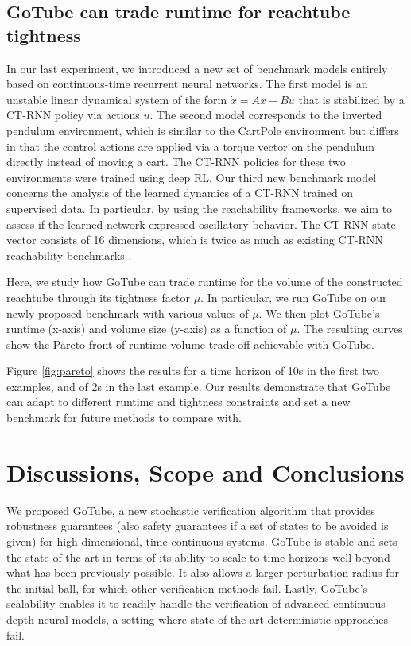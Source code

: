 \documentclass[letterpaper]{article} %
\begin{document}
\subsection{GoTube can trade runtime for reachtube tightness}
In our last experiment, we introduced a new set of benchmark models entirely based on continuous-time recurrent neural networks. 
The first model is an unstable linear dynamical system of the form $\dot{x} = Ax + Bu$ that is stabilized by a CT-RNN policy via actions $u$. The second model corresponds to the inverted pendulum environment, which is similar to the CartPole environment but differs in that the control actions are applied via a torque vector on the pendulum directly instead of moving a cart. The CT-RNN policies for these two environments were trained using deep RL.
Our third new benchmark model concerns the analysis of the learned dynamics of a CT-RNN trained on supervised data. In particular, by using the reachability frameworks, we aim to assess if the learned network expressed oscillatory behavior. The CT-RNN state vector consists of 16 dimensions, which is twice as much as existing CT-RNN reachability benchmarks \cite{gruenbacher2020lagrangian}. 

Here, we study how GoTube can trade runtime for the volume of the constructed reachtube through its tightness factor $\mu$.
In particular, we run GoTube on our newly proposed benchmark with various values of $\mu$. We then plot GoTube's runtime (x-axis) and volume size (y-axis) as a function of $\mu$. The resulting curves show the Pareto-front of runtime-volume trade-off achievable with GoTube.

Figure \ref{fig:pareto} shows the results for a time horizon of 10s in the first two examples, and of 2s in the last example.
Our results demonstrate that GoTube can adapt to different runtime and tightness constraints and set a new benchmark for future methods to compare with.

\section{Discussions, Scope and Conclusions}

We proposed GoTube, a new stochastic verification algorithm that provides robustness guarantees (also safety guarantees if a set of states to be avoided is given)  for high-dimensional, time-continuous systems. GoTube is stable and sets the state-of-the-art in terms of its ability to scale to time horizons well beyond what has been previously possible. It also allows a larger perturbation radius for the initial ball, for which other verification methods fail. Lastly, GoTube's scalability enables it to readily handle the verification of advanced continuous-depth neural models, a setting where state-of-the-art deterministic approaches fail. 
\end{document}
